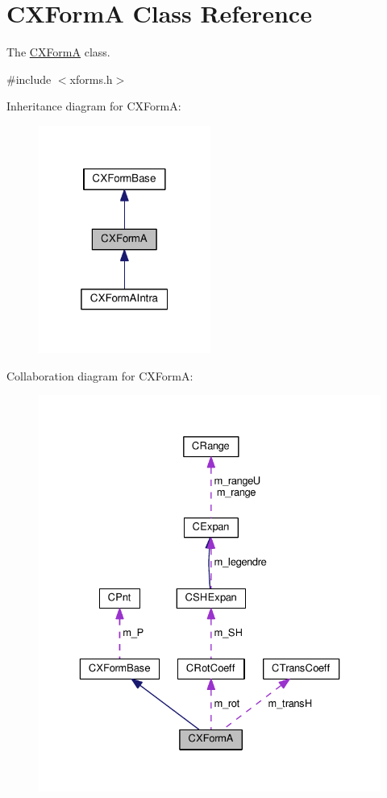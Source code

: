 \hypertarget{classCXFormA}{\section{C\-X\-Form\-A Class Reference}
\label{classCXFormA}
}


The \hyperlink{classCXFormA}{C\-X\-Form\-A} class.  




{\ttfamily \#include $<$xforms.\-h$>$}



Inheritance diagram for C\-X\-Form\-A\-:\nopagebreak
\begin{figure}[H]
\begin{center}
\leavevmode
\includegraphics[width=160pt]{classCXFormA__inherit__graph}
\end{center}
\end{figure}


Collaboration diagram for C\-X\-Form\-A\-:\nopagebreak
\begin{figure}[H]
\begin{center}
\leavevmode
\includegraphics[width=329pt]{classCXFormA__coll__graph}
\end{center}
\end{figure}
